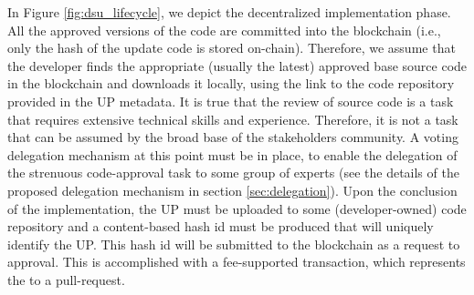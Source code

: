 In Figure \ref{fig:dsu_lifecycle}, we depict the decentralized implementation
phase. All the approved versions of the code are committed into the blockchain
(i.e., only the hash of the update code is stored on-chain). Therefore, we
assume that the developer finds the appropriate (usually the latest) approved
base source code in the blockchain and downloads it locally, using the link to
the %
code repository provided in the UP metadata. %
%
It is true that the review of source code is a task that requires extensive
technical skills and experience. Therefore, it is not a task that can be
assumed by the broad base of the stakeholders community. A voting delegation
mechanism at this point must be in place, to enable the delegation of the
strenuous code-approval task to some group of experts (see the details of the
proposed delegation mechanism in section \ref{sec:delegation}).
Upon the conclusion of the implementation, the UP must be uploaded to some
(developer-owned) code repository and a content-based hash id must be produced
that will uniquely identify the UP. This hash id will be submitted to the
blockchain as a request to approval. This is accomplished with a fee-supported
transaction, which represents the  to a
pull-request.


